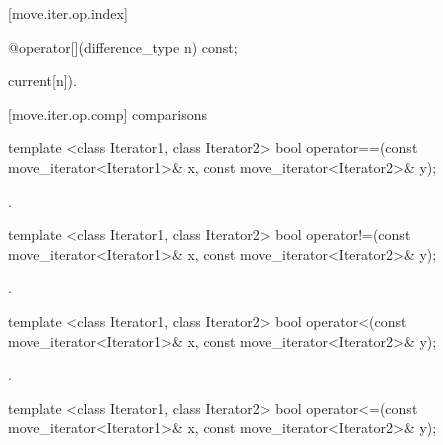 [move.iter.op.index]{}

%
%
\begin{itemdecl}
@\unspec@ operator[](difference_type n) const;
\end{itemdecl}

\begin{itemdescr}
\pnum
\returns {}current[n]).
\end{itemdescr}

[move.iter.op.comp]{ comparisons}

%
%
\begin{itemdecl}
template <class Iterator1, class Iterator2>
bool operator==(const move_iterator<Iterator1>& x, const move_iterator<Iterator2>& y);
\end{itemdecl}

\begin{itemdescr}
\pnum
\returns {}.
\end{itemdescr}

%
%
\begin{itemdecl}
template <class Iterator1, class Iterator2>
bool operator!=(const move_iterator<Iterator1>& x, const move_iterator<Iterator2>& y);
\end{itemdecl}

\begin{itemdescr}
\pnum
\returns {}.
\end{itemdescr}

%
%
\begin{itemdecl}
template <class Iterator1, class Iterator2>
bool operator<(const move_iterator<Iterator1>& x, const move_iterator<Iterator2>& y);
\end{itemdecl}

\begin{itemdescr}
\pnum
\returns {}.
\end{itemdescr}

%
%
\begin{itemdecl}
template <class Iterator1, class Iterator2>
bool operator<=(const move_iterator<Iterator1>& x, const move_iterator<Iterator2>& y);
\end{itemdecl}

